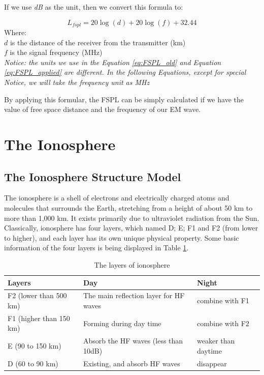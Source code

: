 \documentclass{mcmthesis}
\begin{document}
      If we use \emph{dB} as the unit, then we convert this formula to:

        \begin{equation}\label{eq:FSPL_applied}
          L_{fspl} = 20\log(d) + 20\log(f) + 32.44
        \end{equation}
        Where:\\
        $d$ is the distance of the receiver from the transmitter (km)\\
        $f$ is the signal frequency (MHz)\\

      \emph{Notice: the units we use in the Equation \ref{eq:FSPL_old} and Equation \ref{eq:FSPL_applied} are different. In the following Equations, except for special Notice, we will take the frequency unit as MHz}

      By applying this formular, the FSPL can be simply calculated if we have the value of free space distance and the frequency of our EM wave.

\section{The Ionosphere}

  \subsection{The Ionosphere Structure Model}
    The ionosphere is a shell of electrons and electrically charged atoms and molecules that surrounds the Earth, stretching from a height of about 50 km to more than 1,000 km. It exists primarily due to ultraviolet radiation from the Sun. Classically, ionosphere has four layers, which named D; E; F1 and F2 (from lower to higher), and each layer has its own unique physical property.\cite{davies1990ionospheric} Some basic information of the four layers is being displayed in Table \ref{tab: the ionosphere layers}.

        \begin{table}
          \centering
            \begin{tabular}{|l|l|l|}
            \hline
            Layers                  &Day & Night      \\ \hline
            F2 (lower than 500 km)  & The main reflection layer for HF waves & combine with F1          \\ \hline
            F1 (higher than 150 km) & Forming during day time       & combine with F2    \\ \hline
            E  (90 to 150 km)       & Absorb the HF waves (less than 10dB) & weaker than daytime          \\ \hline
            D  (60 to 90 km)        & Existing, and absorb HF waves &disappear  \\ \hline
            \end{tabular}
            \caption{The layers of ionosphere}
            \label{tab: the ionosphere layers}
        \end{table}
\end{document}
